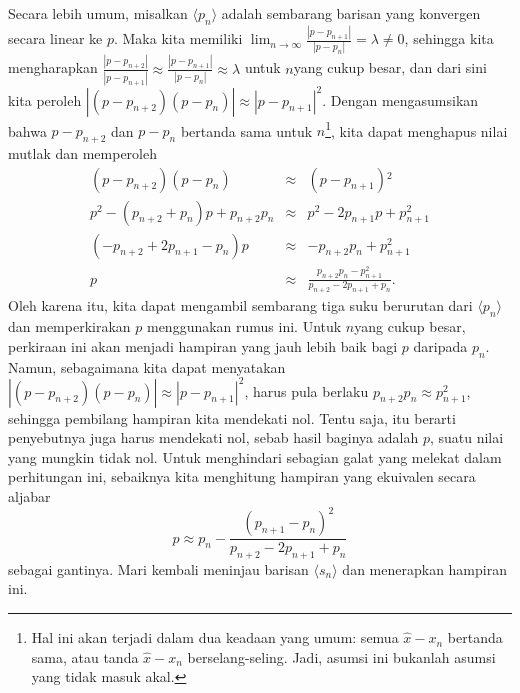Secara lebih umum, misalkan $\langle p_{n}\rangle$ adalah sembarang
barisan yang konvergen secara linear ke $p$. Maka kita memiliki ${\displaystyle \lim_{n\to\infty}}\frac{|p-p_{n+1}|}{|p-p_{n}|}=\lambda\neq0$,
sehingga kita mengharapkan $\frac{|p-p_{n+2}|}{|p-p_{n+1}|}\approx\frac{|p-p_{n+1}|}{|p-p_{n}|}\approx\lambda$
untuk $n$yang cukup besar, dan dari sini kita peroleh $|(p-p_{n+2})(p-p_{n})|\approx|p-p_{n+1}|^{2}$.
Dengan mengasumsikan bahwa $p-p_{n+2}$ dan $p-p_{n}$ bertanda sama
untuk $n$\footnote{Hal ini akan terjadi dalam dua keadaan yang umum: semua $\hat{x}-x_{n}$
bertanda sama, atau tanda $\hat{x}-x_{n}$ berselang-seling. Jadi,
asumsi ini bukanlah asumsi yang tidak masuk akal.}, kita dapat menghapus nilai mutlak dan memperoleh
\begin{eqnarray*}
(p-p_{n+2})(p-p_{n}) & \approx & (p-p_{n+1}){}^{2}\\
p^{2}-(p_{n+2}+p_{n})p+p_{n+2}p_{n} & \approx & p^{2}-2p_{n+1}p+p_{n+1}^{2}\\
(-p_{n+2}+2p_{n+1}-p_{n})p & \approx & -p_{n+2}p_{n}+p_{n+1}^{2}\\
p & \approx & \frac{p_{n+2}p_{n}-p_{n+1}^{2}}{p_{n+2}-2p_{n+1}+p_{n}}.
\end{eqnarray*}
Oleh karena itu, kita dapat mengambil sembarang tiga suku berurutan
dari $\langle p_{n}\rangle$ dan memperkirakan $p$ menggunakan rumus
ini. Untuk $n$yang cukup besar, perkiraan ini akan menjadi hampiran
yang jauh lebih baik bagi $p$ daripada $p_{n}$. Namun, sebagaimana
kita dapat menyatakan $|(p-p_{n+2})(p-p_{n})|\approx|p-p_{n+1}|^{2}$,
harus pula berlaku $p_{n+2}p_{n}\approx p_{n+1}^{2}$, sehingga pembilang
hampiran kita mendekati nol. Tentu saja, itu berarti penyebutnya juga
harus mendekati nol, sebab hasil baginya adalah $p$, suatu nilai
yang mungkin tidak nol. Untuk menghindari sebagian galat yang melekat
dalam perhitungan ini, sebaiknya kita menghitung hampiran yang ekuivalen
secara aljabar 
\begin{equation}
p\approx p_{n}-\frac{(p_{n+1}-p_{n})^{2}}{p_{n+2}-2p_{n+1}+p_{n}}\label{eq:aitkensDeltaSquared}
\end{equation}
 sebagai gantinya. Mari kembali meninjau barisan $\langle s_{n}\rangle$
dan menerapkan hampiran ini.


